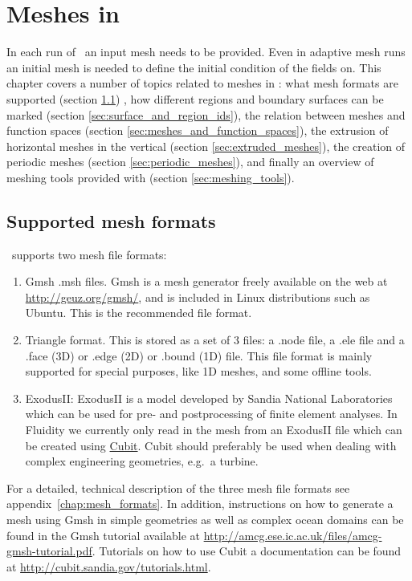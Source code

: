 \chapter{Meshes in \fluidity}\label{chap:meshes}

In each run of \fluidity\ an input mesh needs to 
be provided. Even in adaptive mesh runs an initial mesh is needed
to define the initial condition of the fields on. 
This chapter covers a number of topics 
related to meshes in \fluidity:  what
mesh formats are supported (section \ref{sec:supported_mesh_formats})
, how different regions and boundary surfaces can be
marked (section \ref{sec:surface_and_region_ids}), 
the relation between meshes and function spaces (section
\ref{sec:meshes_and_function_spaces}), the extrusion of 
horizontal meshes in the vertical (section \ref{sec:extruded_meshes}), 
the creation of periodic meshes (section \ref{sec:periodic_meshes}),
and finally an overview of meshing tools provided with \fluidity (section
\ref{sec:meshing_tools}).

\section{Supported mesh formats}
\label{sec:supported_mesh_formats}
\fluidity\ supports two mesh file formats:
\begin{enumerate}
\item Gmsh .msh files. Gmsh is a mesh generator freely available on the
web at \url{http://geuz.org/gmsh/}, and is included in Linux distributions 
such as Ubuntu. This is the recommended file format.
\item Triangle format. This is stored as a set of 3 files: a .node file,
a .ele file and a .face (3D) or .edge (2D) or .bound (1D) file. This file format
is mainly supported for special purposes, like 1D meshes, and some offline 
tools.
\item ExodusII: ExodusII is a model developed by Sandia National Laboratories 
which can be used for pre- and postprocessing of finite element analyses. 
In Fluidity we currently only read in the mesh from an ExodusII file which 
can be created using \href{http://cubit.sandia.gov/}{Cubit}. Cubit should 
preferably be used when dealing with complex engineering geometries, e.g.~a 
turbine.
\end{enumerate}

For a detailed, technical description of the three mesh file formats see 
appendix~\ref{chap:mesh_formats}. In addition, instructions on how
to generate a mesh using Gmsh in simple geometries as well as complex
ocean domains can be found in the Gmsh tutorial available at
\url{http://amcg.ese.ic.ac.uk/files/amcg-gmsh-tutorial.pdf}. Tutorials 
on how to use Cubit a documentation can be found at 
\url{http://cubit.sandia.gov/tutorials.html}.

